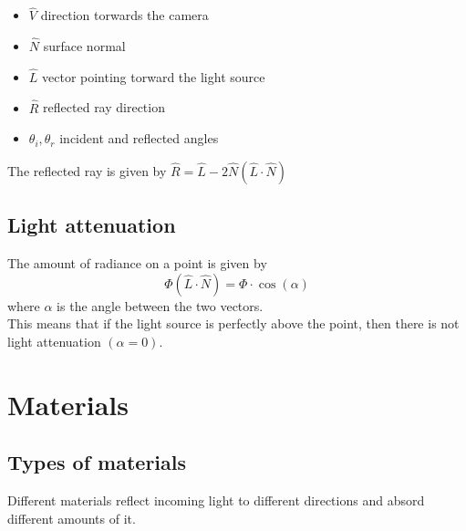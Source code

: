 \documentclass[a4paper]{article}
\begin{document}
\begin{itemize}
    \item \(\hat{V}\) direction torwards the camera
    \item \(\hat{N}\) surface normal
    \item \(\hat{L}\) vector pointing torward the light source
    \item \(\hat{R}\) reflected ray direction
    \item \({\theta}_i, {\theta}_r\) incident and reflected angles
\end{itemize}

The reflected ray is given by \(\hat{R}=\hat{L}-2\hat{N}(\hat{L}\cdot\hat{N})\)

\subsection{Light attenuation}

The amount of radiance on a point is given by
\[
    \Phi \left(\hat{L} \cdot \hat{N}\right) = \Phi \cdot \cos(\alpha)
\]
where \(\alpha\) is the angle between the two vectors.
\\
This means that if the light source is perfectly above the point, then
there is not light attenuation \((\alpha = 0)\).

\pagebreak

\section{Materials}

\subsection{Types of materials}

Different materials reflect incoming light to different directions and absord different amounts of it.
\end{document}
